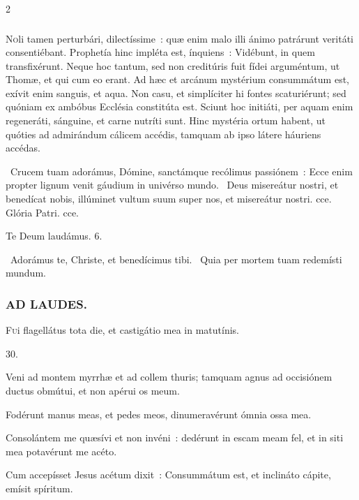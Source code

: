 \documentclass[9pt,twoside]{extarticle}
\begin{document}
\begin{multicols}{2}
\subsubsection*{\center{}}
\lettrine{N}oli tamen perturbári, dilectíssime~: quæ enim malo illi ánimo patrárunt veritáti consentiébant. Prophetía hinc impléta est, ínquiens~: Vidébunt, in quem transfixérunt. Neque hoc tantum, sed non creditúris fuit fídei arguméntum, ut Thomæ, et qui cum eo erant. Ad hæc et arcánum mystérium consummátum est, exívit enim sanguis, et aqua. Non casu, et simplíciter hi fontes scaturiérunt; sed quóniam ex ambóbus Ecclésia constitúta est. Sciunt hoc initiáti, per aquam enim regeneráti, sánguine, et carne nutríti sunt. Hinc mystéria ortum habent, ut quóties ad admirándum cálicem accédis, tamquam ab ipso látere háuriens accédas.

\begin{tightlist}{}
\item {}~Crucem tuam adorámus, Dómine, sanctámque recólimus passiónem~: \textred{*} Ecce enim propter lignum venit gáudium in univérso mundo. ~Deus misereátur nostri, et benedícat nobis, illúminet vultum suum super nos, et misereátur nostri. cce. Glória Patri. cce.
\item Te Deum laudámus. 6.
\item {}~Adorámus te, Christe, et benedícimus tibi. ~Quia per mortem tuam redemísti mundum.
\end{tightlist}

\subsubsection*{\center \textsc{AD LAUDES.}}
\begin{center}\end{center}
\lettrine{F}ui flagellátus tota die, et castigátio mea in matutínis.

\begin{tightlist}{}
\item {} 30.
\item {} Veni ad montem myrrhæ et ad collem thuris; tamquam agnus ad occisiónem ductus obmútui, et non apérui os meum.
\item {} Fodérunt manus meas, et pedes meos, dinumeravérunt ómnia ossa mea.
\item {} Consolántem me quæsívi et non invéni~: dedérunt in escam meam fel, et in siti mea potavérunt me acéto.
\item {} Cum accepísset Jesus acétum dixit~: Consummátum est, et inclináto cápite, emísit spíritum.
\end{tightlist}


\end{multicols}
\end{document}
